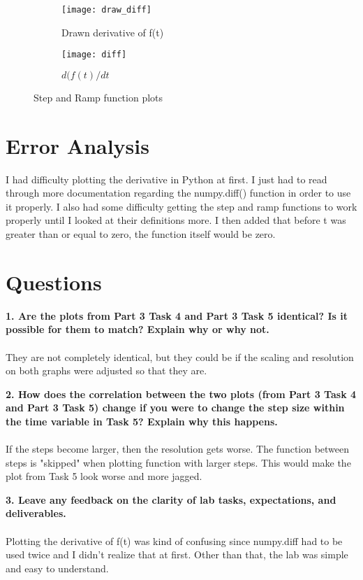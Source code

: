 \documentclass[12pt]{report}
\begin{document}
\begin{figure}
     \centering
     \begin{subfigure}[b]{0.4\textwidth}
         \centering
         \texttt{[image: draw\_diff]}
         \caption{Drawn derivative of f(t)}
         \label{fig:y equals x}
     \end{subfigure}
     \hfill
     \begin{subfigure}[b]{0.4\textwidth}
         \centering
         \texttt{[image: diff]}
         \caption{$d(f(t)/dt$}
         \label{fig:three sin x}
     \end{subfigure}
        \caption{Step and Ramp function plots}
        \label{fig:three graphs}
\end{figure}

\section{Error Analysis}
I had difficulty plotting the derivative in Python at first. I just had to read through more documentation regarding the numpy.diff() function in order to use it properly. I also had some difficulty getting the step and ramp functions to work properly until I looked at their definitions more. I then added that before t was greater than or equal to zero, the function itself would be zero.
\section{Questions}
\textbf{1. Are the plots from Part 3 Task 4 and Part 3 Task 5 identical? Is it possible for them to
match? Explain why or why not.} \\ \\
They are not completely identical, but they could be if the scaling and resolution on both graphs were adjusted so that they are.

\textbf{2. How does the correlation between the two plots (from Part 3 Task 4 and Part 3 Task 5)
change if you were to change the step size within the time variable in Task 5? Explain why
this happens.} \\ \\
If the steps become larger, then the resolution gets worse. The function between steps is "skipped" when plotting function with larger steps. This would make the plot from Task 5 look worse and more jagged.

\textbf{3. Leave any feedback on the clarity of lab tasks, expectations, and deliverables.} \\ \\
Plotting the derivative of f(t) was kind of confusing since numpy.diff had to be used twice and I didn't realize that at first. Other than that, the lab was simple and easy to understand.
\end{document}
